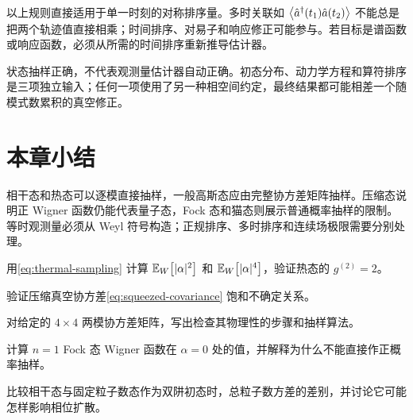 以上规则直接适用于单一时刻的对称排序量。多时关联如 $\left\langle \hat a^{\dagger}(t_1)\hat a(t_2)\right\rangle$ 不能总是把两个轨迹值直接相乘；时间排序、对易子和响应修正可能参与。若目标是谱函数或响应函数，必须从所需的时间排序重新推导估计器。

\begin{warningbox}
状态抽样正确，不代表观测量估计器自动正确。初态分布、动力学方程和算符排序是三项独立输入；任何一项使用了另一种相空间约定，最终结果都可能相差一个随模式数累积的真空修正。
\end{warningbox}

\section*{本章小结}

相干态和热态可以逐模直接抽样，一般高斯态应由完整协方差矩阵抽样。压缩态说明正 Wigner 函数仍能代表量子态，Fock 态和猫态则展示普通概率抽样的限制。等时观测量必须从 Weyl 符号构造；正规排序、多时排序和连续场极限需要分别处理。

\begin{exercises}
  \item 用\cref{eq:thermal-sampling} 计算 $\mathbb{E}_{W}\!\left[|\alpha|^2\right]$ 和 $\mathbb{E}_{W}\!\left[|\alpha|^4\right]$，验证热态的 $g^{(2)}=2$。
  \item 验证压缩真空协方差\cref{eq:squeezed-covariance} 饱和不确定关系。
  \item 对给定的 $4\times4$ 两模协方差矩阵，写出检查其物理性的步骤和抽样算法。
  \item 计算 $n=1$ Fock 态 Wigner 函数在 $\alpha=0$ 处的值，并解释为什么不能直接作正概率抽样。
  \item 比较相干态与固定粒子数态作为双阱初态时，总粒子数方差的差别，并讨论它可能怎样影响相位扩散。
\end{exercises}

